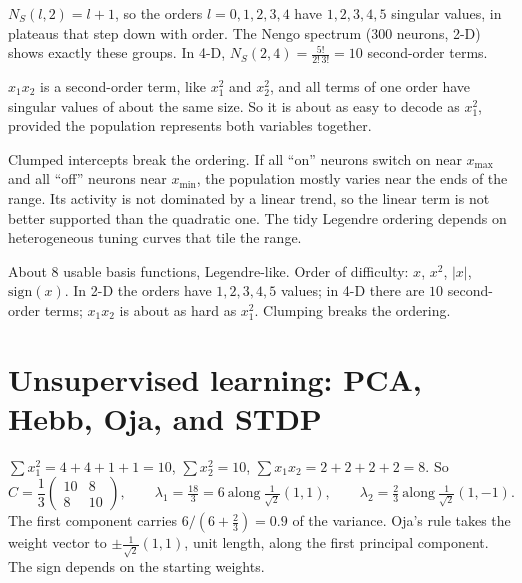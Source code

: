 \documentclass[11pt,letterpaper]{article}
\newcommand{\ans}[1]{\par\vspace{4pt}{\bfseries #1}\quad}
\begin{document}
\ans{Q2}
$N_S(l, 2) = l + 1$, so the orders $l = 0, 1, 2, 3, 4$ have $1, 2, 3, 4, 5$ singular values, in plateaus that step down with order. The Nengo spectrum (300 neurons, 2-D) shows exactly these groups. In 4-D, $N_S(2, 4) = \frac{5!}{2!\,3!} = 10$ second-order terms.

$x_1x_2$ is a second-order term, like $x_1^2$ and $x_2^2$, and all terms of one order have singular values of about the same size. So it is about as easy to decode as $x_1^2$, provided the population represents both variables together.

Clumped intercepts break the ordering. If all ``on'' neurons switch on near $x_{\max}$ and all ``off'' neurons near $x_{\min}$, the population mostly varies near the ends of the range. Its activity is not dominated by a linear trend, so the linear term is not better supported than the quadratic one. The tidy Legendre ordering depends on heterogeneous tuning curves that tile the range.
\begin{center}
\end{center}
\begin{result}
About $8$ usable basis functions, Legendre-like. Order of difficulty: $x$, $x^2$, $|x|$, $\mathrm{sign}(x)$. In 2-D the orders have $1, 2, 3, 4, 5$ values; in 4-D there are $10$ second-order terms; $x_1x_2$ is about as hard as $x_1^2$. Clumping breaks the ordering.
\end{result}

\section{Unsupervised learning: PCA, Hebb, Oja, and STDP}

\ans{Q1}
$\sum x_1^2 = 4 + 4 + 1 + 1 = 10$, $\sum x_2^2 = 10$, $\sum x_1x_2 = 2 + 2 + 2 + 2 = 8$. So
\[
C = \frac13\begin{pmatrix} 10 & 8 \\ 8 & 10 \end{pmatrix}, \qquad \lambda_1 = \tfrac{18}{3} = 6 \ \text{along}\ \tfrac{1}{\sqrt2}(1, 1), \qquad \lambda_2 = \tfrac23 \ \text{along}\ \tfrac{1}{\sqrt2}(1, -1).
\]
The first component carries $6/(6 + \tfrac23) = 0.9$ of the variance. Oja's rule takes the weight vector to $\pm\frac{1}{\sqrt2}(1, 1)$, unit length, along the first principal component. The sign depends on the starting weights.
\end{document}
